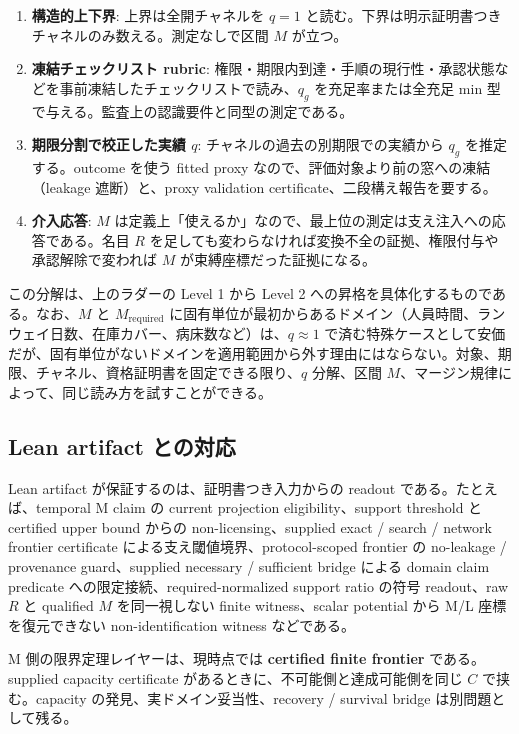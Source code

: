 \documentclass[12pt,a4paper]{article}
\begin{document}
\begin{enumerate}
\def\labelenumi{\arabic{enumi}.}
\tightlist
\item
  \textbf{構造的上下界}: 上界は全開チャネルを \(q=1\) と読む。下界は明示証明書つきチャネルのみ数える。測定なしで区間 \(M\) が立つ。
\item
  \textbf{凍結チェックリスト rubric}: 権限・期限内到達・手順の現行性・承認状態などを事前凍結したチェックリストで読み、\(q_g\) を充足率または全充足 min 型で与える。監査上の認識要件と同型の測定である。
\item
  \textbf{期限分割で校正した実績 \(q\)}: チャネルの過去の別期限での実績から \(q_g\) を推定する。outcome を使う fitted proxy なので、評価対象より前の窓への凍結（leakage 遮断）と、proxy validation certificate、二段構え報告を要する。
\item
  \textbf{介入応答}: \(M\) は定義上「使えるか」なので、最上位の測定は支え注入への応答である。名目 \(R\) を足しても変わらなければ変換不全の証拠、権限付与や承認解除で変われば \(M\) が束縛座標だった証拠になる。
\end{enumerate}

この分解は、上のラダーの Level 1 から Level 2 への昇格を具体化するものである。なお、\(M\) と \(M_{\mathrm{required}}\) に固有単位が最初からあるドメイン（人員時間、ランウェイ日数、在庫カバー、病床数など）は、\(q \approx 1\) で済む特殊ケースとして安価だが、固有単位がないドメインを適用範囲から外す理由にはならない。対象、期限、チャネル、資格証明書を固定できる限り、\(q\) 分解、区間 \(M\)、マージン規律によって、同じ読み方を試すことができる。

\subsection{Lean artifact との対応}\label{lean-artifact-ux3068ux306eux5bfeux5fdc}

Lean artifact が保証するのは、証明書つき入力からの readout である。たとえば、temporal M claim の current projection eligibility、support threshold と certified upper bound からの non-licensing、supplied exact / search / network frontier certificate による支え閾値境界、protocol-scoped frontier の no-leakage / provenance guard、supplied necessary / sufficient bridge による domain claim predicate への限定接続、required-normalized support ratio の符号 readout、raw $R$ と qualified $M$ を同一視しない finite witness、scalar potential から M/L 座標を復元できない non-identification witness などである。

M 側の限界定理レイヤーは、現時点では \textbf{certified finite frontier} である。supplied capacity certificate があるときに、不可能側と達成可能側を同じ \(C\) で挟む。capacity の発見、実ドメイン妥当性、recovery / survival bridge は別問題として残る。
\end{document}
